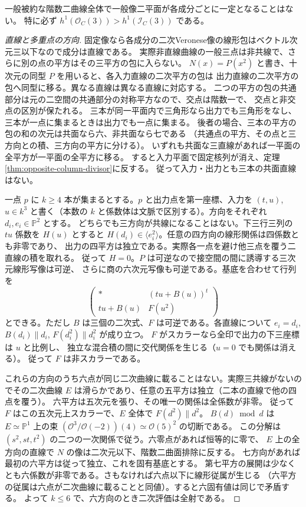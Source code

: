 \begin{theorem}\label{thm:cofactor-singular-special}
一般被約な階数二曲線全体で一般像二平面が各成分ごとに一定となることはない。
特に必ず $h^1(\mathcal O_C(3))>h^1(\mathcal I_C(3))$ である。
\end{theorem}
\begin{proof}[直線と多重点の方向]
固定像なら各成分の二次Veronese像の線形包はベクトル次元三以下なので成分は直線である。
実際非直線曲線の一般三点は非共線で、さらに別の点の平方はその三平方の包に入らない。
$N(x)=P(x^2)$ と書き、十次元の同型 $P$ を用いると、各入力直線の二次平方の包は
出力直線の二次平方の包へ同型に移る。異なる直線は異なる直線に対応する。
二つの平方の包の共通部分は元の二空間の共通部分の対称平方なので、交点は階数一で、
交点と非交点の区別が保たれる。
三本が同一平面内で三角形なら出力でも三角形をなし、三本が一点に集まるときは出力でも一点に集まる。
後者の場合、三本の平方の包の和の次元は共面なら六、非共面なら七である
（共通点の平方、その点と三方向との積、三方向の平方に分ける）。
いずれも共面な三直線があれば一平面の全平方が一平面の全平方に移る。
すると入力平面で固定核列が消え、定理\ref{thm:opposite-column-divisor}に反する。
従って入力・出力とも三本の共面直線はない。

一点 $p$ に $k\ge4$ 本が集まるとする。$p$ と出力点を第一座標、入力を $(t,u)$, $u\in k^3$
と書く（本数の $k$ と係数体は文脈で区別する）。方向をそれぞれ $d_i,e_i\in\mathbb P^2$ とする。
どちらでも三方向が共線になることはない。下三行三列の $tu$ 係数を $H(u)$ とすると
$H(d_i)\in\langle e_i^2\rangle$。任意の四方向の線形関係は四係数とも非零であり、
出力の四平方は独立である。実際各一点を避け他三点を覆う二直線の積を取れる。
従って $H=0$。$P$ は可逆なので接空間の間に誘導する三次元線形写像は可逆、
さらに商の六次元写像も可逆である。基底を合わせて行列を
\[
 \begin{pmatrix} * & (tu+B(u))^t\\tu+B(u)& F(u^2)\end{pmatrix}
\]
とできる。ただし $B$ は三個の二次式、$F$ は可逆である。各直線について
$e_i=d_i$, $B(d_i)\parallel d_i$, $F(d_i^2)\parallel d_i^2$ が成り立つ。
$F$ がスカラーなら全印で出力の下三座標は $u$ と比例し、
独立な混合積の間に交代関係を生じる（$u=0$ でも関係は消える）。
従って $F$ は非スカラーである。

これらの方向のうち六点が同じ二次曲線に載ることはない。実際三共線がないのでその二次曲線
$E$ は滑らかであり、任意の五平方は独立（二本の直線で他の四点を覆う）。
六平方は五次元を張り、その唯一の関係は全係数が非零。
従って $F$ はこの五次元上スカラーで、$E$ 全体で $F(d^2)\parallel d^2$。
$B(d)\bmod d$ は $E\simeq\mathbb P^1$ 上の束
$(\mathcal O^3/\mathcal O(-2))(4)\simeq\mathcal O(5)^2$ の切断である。
この分解は $(s^2,st,t^2)$ の二つの一次関係で従う。六零点があれば恒等的に零で、
$E$ 上の全方向の直線で $N$ の像は二次元以下、階数二曲面排除に反する。
七方向があれば最初の六平方は従って独立、これを固有基底とする。
第七平方の展開は少なくとも六係数が非零である。さもなければ六点以下に線形従属が生じる
（六平方の従属は六点が二次曲線に載ることと同値）。すると六固有値は同じで矛盾する。
よって $k\le6$ で、六方向のとき二次評価は全射である。
\end{proof}

